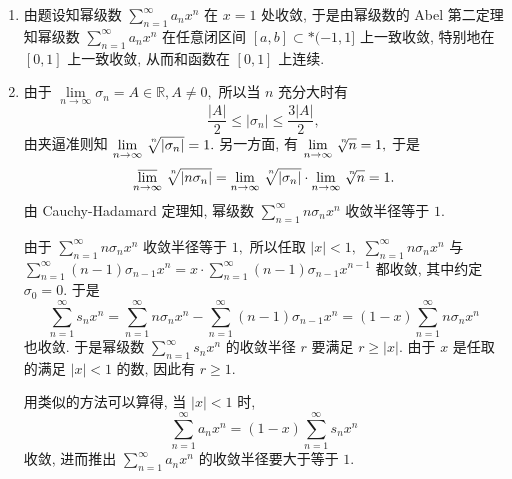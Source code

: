 \begin{solution}
  \begin{enumerate}
    \item 由题设知幂级数 $\sum\limits_{n=1}^{\infty} a_nx^n$ 在 $x = 1$ 处收敛, 于是由幂级数的 Abel 第二定理知幂级数 $\sum\limits_{n=1}^{\infty} a_nx^n$ 在任意闭区间 $[a, b] \subset* (-1, 1]$ 上一致收敛, 特别地在 $[0, 1]$ 上一致收敛, 从而和函数在 $[0, 1]$ 上连续.
    \item 由于 $\lim\limits_{n\to\infty} \sigma_n = A \in \mathbb{R}, A \neq 0,$ 所以当 $n$ 充分大时有
    $$\dfrac{\lvert A \rvert}{2} \leqslant \lvert \sigma_n \rvert \leqslant \dfrac{3\lvert A \rvert}{2},$$
    由夹逼准则知 $\lim\limits_{n\to\infty} \nroot[n]{\lvert \sigma_n \rvert} = 1.$ 另一方面, 有 $\lim\limits_{n\to\infty} \nroot[n]{n} = 1,$ 于是
    $$\varlimsup_{n\to\infty} \nroot[n]{\lvert n\sigma_n \rvert} = \lim\limits_{n\to\infty} \nroot[n]{\lvert \sigma_n \rvert} \cdot \lim\limits_{n\to\infty} \nroot[n]{n} = 1.$$
    由 Cauchy-Hadamard 定理知, 幂级数 $\sum\limits_{n=1}^{\infty} n\sigma_n x^n$ 收敛半径等于 $1.$

    由于 $\sum\limits_{n=1}^{\infty} n\sigma_n x^n$ 收敛半径等于 $1,$ 所以任取 $\lvert x \rvert < 1,$ $\sum\limits_{n=1}^{\infty} n\sigma_n x^n$ 与 $\sum\limits_{n=1}^{\infty} (n-1) \sigma_{n-1} x^n = x \cdot \sum\limits_{n=1}^{\infty} (n-1) \sigma_{n-1} x^{n-1}$ 都收敛, 其中约定 $\sigma_0 = 0.$ 于是
    $$\sum\limits_{n=1}^{\infty} s_n x^n = \sum\limits_{n=1}^{\infty} n\sigma_n x^n - \sum\limits_{n=1}^{\infty} (n-1) \sigma_{n-1} x^n = (1-x) \sum\limits_{n=1}^{\infty} n\sigma_n x^n$$
    也收敛. 于是幂级数 $\sum\limits_{n=1}^{\infty} s_n x^n$ 的收敛半径 $r$ 要满足 $r \geqslant \lvert x \rvert.$ 由于 $x$ 是任取的满足 $\lvert x \rvert < 1$ 的数, 因此有 $r \geqslant 1.$

    用类似的方法可以算得, 当 $\lvert x \rvert < 1$ 时,
    $$\sum\limits_{n=1}^{\infty} a_n x^n = (1 - x) \sum\limits_{n=1}^{\infty} s_n x^n$$
    收敛, 进而推出 $\sum\limits_{n=1}^{\infty} a_n x^n$ 的收敛半径要大于等于 $1.$


\end{enumerate}
\end{solution}
